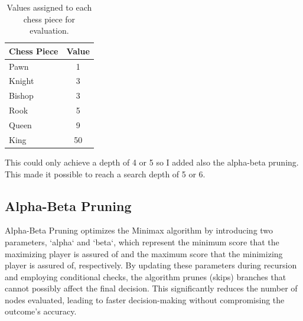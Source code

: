 \documentclass{article}
\begin{document}
\begin{table}[ht]
\centering
\begin{tabular}{|l|c|}
\hline
\textbf{Chess Piece} & \textbf{Value} \\
\hline
Pawn & 1 \\
\hline
Knight & 3 \\
\hline
Bishop & 3 \\
\hline
Rook & 5 \\
\hline
Queen & 9 \\
\hline
King & 50 \\
\hline
\end{tabular}
\caption{Values assigned to each chess piece for evaluation.}
\label{table:chess_piece_values}
\end{table}


This could only achieve a depth of 4 or 5 so I added also the alpha-beta pruning. This made it possible to reach a search depth of 5 or 6.





















\subsection{Alpha-Beta Pruning}

 Alpha-Beta Pruning optimizes the Minimax algorithm by introducing two parameters, `alpha` and `beta`, which represent the minimum score that the maximizing player is assured of and the maximum score that the minimizing player is assured of, respectively. By updating these parameters during recursion and employing conditional checks, the algorithm prunes (skips) branches that cannot possibly affect the final decision. This significantly reduces the number of nodes evaluated, leading to faster decision-making without compromising the outcome's accuracy.
\end{document}
